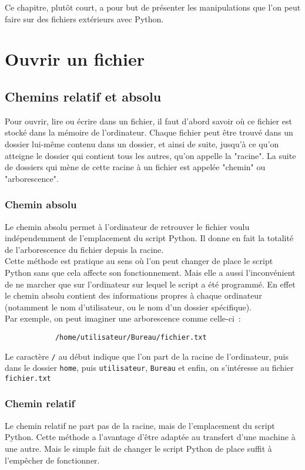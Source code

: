 Ce chapitre, plutôt court, a pour but de présenter les manipulations que l'on peut faire sur des fichiers extérieurs avec Python.

\section{Ouvrir un fichier}
	
	\subsection{Chemins relatif et absolu}
		
		Pour ouvrir, lire ou écrire dans un fichier, il faut d'abord savoir où ce fichier est stocké dans la mémoire de l'ordinateur. Chaque fichier peut être trouvé dans un dossier lui-même contenu dans un dossier, et ainsi de suite, jusqu'à ce qu'on atteigne le dossier qui contient tous les autres, qu'on appelle la "racine". La suite de dossiers qui mène de cette racine à un fichier est appelée "chemin" ou "arborescence".
		
		\subsubsection{Chemin absolu}
		Le chemin absolu permet à l'ordinateur de retrouver le fichier voulu indépendemment de l'emplacement du script Python. Il donne en fait la totalité de l'arborescence du fichier depuis la racine. \\
		
		Cette méthode est pratique au sens où l'on peut changer de place le script Python sans que cela affecte son fonctionnement. Mais elle a aussi l'inconvénient de ne marcher que sur l'ordinateur sur lequel le script a été programmé. En effet le chemin absolu contient des informations propres à chaque ordinateur (notamment le nom d'utilisateur, ou le nom d'un dossier spécifique). \\
		
		Par exemple, on peut imaginer une arborescence comme celle-ci~:
		\begin{verbatim}
			/home/utilisateur/Bureau/fichier.txt
		\end{verbatim}
		Le caractère \verb|/| au début indique que l'on part de la racine de l'ordinateur, puis dans le dossier \verb|home|, puis \verb|utilisateur|, \verb|Bureau| et enfin, on s'intéresse au fichier \verb|fichier.txt|
	
		\subsubsection{Chemin relatif} \label{chemin_relatif}
		Le chemin relatif ne part pas de la racine, mais de l'emplacement du script Python. Cette méthode a l'avantage d'être adaptée au transfert d'une machine à une autre. Mais le simple fait de changer le script Python de place suffit à l'empêcher de fonctionner. \\
	
